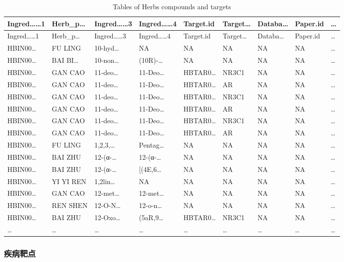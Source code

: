 \documentclass[
]{article}
\begin{document}
\begin{longtable}[]{@{}lllllllll@{}}
\caption{\label{tab:tables-of-Herbs-compounds-and-targets}Tables of Herbs compounds and targets}\tabularnewline
\toprule
Ingred\ldots\ldots1 & Herb\_p\ldots{} & Ingred\ldots\ldots3 & Ingred\ldots\ldots4 & Target.id & Target\ldots{} & Databa\ldots{} & Paper.id & \ldots{}\tabularnewline
\midrule
\endfirsthead
\toprule
Ingred\ldots\ldots1 & Herb\_p\ldots{} & Ingred\ldots\ldots3 & Ingred\ldots\ldots4 & Target.id & Target\ldots{} & Databa\ldots{} & Paper.id & \ldots{}\tabularnewline
\midrule
\endhead
HBIN00\ldots{} & FU LING & 10-hyd\ldots{} & NA & NA & NA & NA & NA & \ldots{}\tabularnewline
HBIN00\ldots{} & BAI BI\ldots{} & 10-non\ldots{} & (10R)-\ldots{} & NA & NA & NA & NA & \ldots{}\tabularnewline
HBIN00\ldots{} & GAN CAO & 11-deo\ldots{} & 11-Deo\ldots{} & HBTAR0\ldots{} & NR3C1 & NA & NA & \ldots{}\tabularnewline
HBIN00\ldots{} & GAN CAO & 11-deo\ldots{} & 11-Deo\ldots{} & HBTAR0\ldots{} & AR & NA & NA & \ldots{}\tabularnewline
HBIN00\ldots{} & GAN CAO & 11-deo\ldots{} & 11-Deo\ldots{} & HBTAR0\ldots{} & NR3C1 & NA & NA & \ldots{}\tabularnewline
HBIN00\ldots{} & GAN CAO & 11-deo\ldots{} & 11-Deo\ldots{} & HBTAR0\ldots{} & AR & NA & NA & \ldots{}\tabularnewline
HBIN00\ldots{} & GAN CAO & 11-deo\ldots{} & 11-Deo\ldots{} & HBTAR0\ldots{} & NR3C1 & NA & NA & \ldots{}\tabularnewline
HBIN00\ldots{} & GAN CAO & 11-deo\ldots{} & 11-Deo\ldots{} & HBTAR0\ldots{} & AR & NA & NA & \ldots{}\tabularnewline
HBIN00\ldots{} & FU LING & 1,2,3,\ldots{} & Pentag\ldots{} & NA & NA & NA & NA & \ldots{}\tabularnewline
HBIN00\ldots{} & BAI ZHU & 12-(α-\ldots{} & 12-(α-\ldots{} & NA & NA & NA & NA & \ldots{}\tabularnewline
HBIN00\ldots{} & BAI ZHU & 12-(α-\ldots{} & {[}(4E,6\ldots{} & NA & NA & NA & NA & \ldots{}\tabularnewline
HBIN00\ldots{} & YI YI REN & 1,2lin\ldots{} & NA & NA & NA & NA & NA & \ldots{}\tabularnewline
HBIN00\ldots{} & GAN CAO & 12-met\ldots{} & 12-met\ldots{} & NA & NA & NA & NA & \ldots{}\tabularnewline
HBIN00\ldots{} & REN SHEN & 12-O-N\ldots{} & 12-o-n\ldots{} & NA & NA & NA & NA & \ldots{}\tabularnewline
HBIN00\ldots{} & BAI ZHU & 12-Oxo\ldots{} & (5aR,9\ldots{} & HBTAR0\ldots{} & NR3C1 & NA & NA & \ldots{}\tabularnewline
\ldots{} & \ldots{} & \ldots{} & \ldots{} & \ldots{} & \ldots{} & \ldots{} & \ldots{} & \ldots{}\tabularnewline
\bottomrule
\end{longtable}

\hypertarget{ux75beux75c5ux9776ux70b9}{%
\subsubsection{疾病靶点}\label{ux75beux75c5ux9776ux70b9}}
\end{document}
